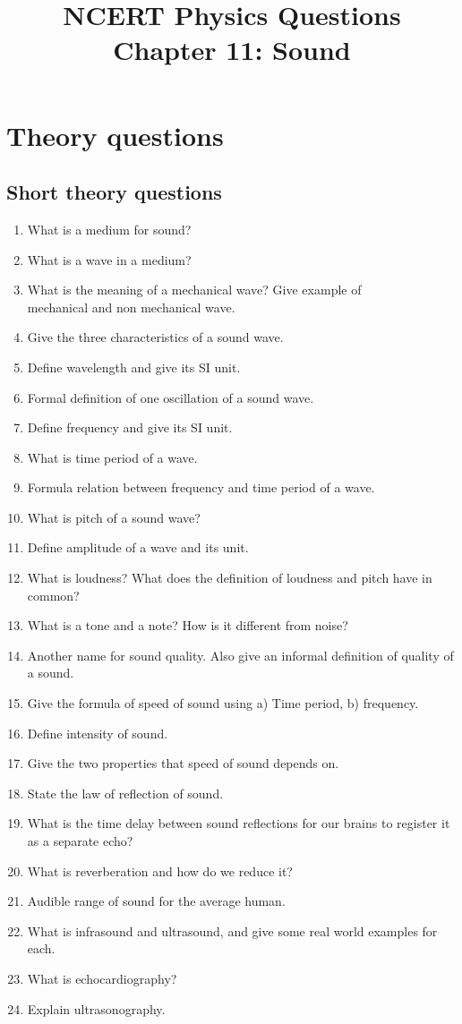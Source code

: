 \documentclass[12pt]{article}
\title{NCERT Physics Questions \\ Chapter 11: Sound}
\author{}
\date{}
\begin{document}
\maketitle

\section*{Theory questions}
\subsection*{Short theory questions}
\begin{enumerate}
	\item What is a medium for sound?
	\item What is a wave in a medium?
	\item What is the meaning of a mechanical wave? Give example of \\ mechanical and non mechanical wave.
	\item Give the three characteristics of a sound wave.
	\item Define wavelength and give its SI unit.
	\item Formal definition of one oscillation of a sound wave.
	\item Define frequency and give its SI unit.
	\item What is time period of a wave.
	\item Formula relation between frequency and time period of a wave.
	\item What is pitch of a sound wave?
	\item Define amplitude of a wave and its unit.
	\item What is loudness? What does the definition of loudness and pitch have in common?
	\item What is a tone and a note? How is it different from noise?
	\item Another name for sound quality. Also give an informal definition of quality of a sound.
	\item Give the formula of speed of sound using a) Time period, b) frequency.
	\item Define intensity of sound.
	\item Give the two properties that speed of sound depends on.
	\item State the law of reflection of sound.
	\item What is the time delay between sound reflections for our brains to register it as a separate echo?
	\item What is reverberation and how do we reduce it?
	\item Audible range of sound for the average human.
	\item What is infrasound and ultrasound, and give some real world examples for each.
	\item What is echocardiography?
	\item Explain ultrasonography.
\end{enumerate}
\end{document}
